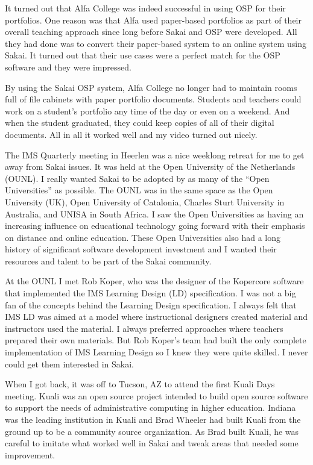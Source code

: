 \documentclass[12pt]{book}
\begin{document}
It turned out that Alfa College was indeed successful
in using OSP for their portfolios.  One reason was that
Alfa used paper-based portfolios as part of their
overall teaching approach since long before Sakai and OSP
were developed.  All they had done was to convert their paper-based
system to an online system using Sakai.  It turned out that their
use cases were a perfect match for the OSP software
and they were impressed.

By using the Sakai OSP system, Alfa College
no longer had to maintain
rooms full of file cabinets with paper portfolio
documents.   Students and teachers could work on a student's
portfolio any time of the day or even on a weekend.  And when
the student graduated, they could keep copies of all of their
digital documents.   All in all it worked well and my
video turned out nicely.

The IMS Quarterly meeting in Heerlen was a nice weeklong
retreat for me to get away from Sakai issues.   It was held at the
Open University of the Netherlands (OUNL).   I really wanted Sakai
to be adopted by as many of the ``Open Universities'' as
possible.  The OUNL was in the same space as the Open University
(UK), Open University of Catalonia, Charles Sturt
University in Australia, and UNISA in South Africa.  I saw the
Open Universities as having an increasing influence on educational
technology going forward with their emphasis on distance and
online education.   These Open Universities also had a long
history of significant software development investment and I
wanted their resources and talent to be part of the Sakai
community.

At the OUNL I met Rob Koper, who was the designer of the
Kopercore software that implemented the IMS Learning Design (LD)
specification.  I was not a big fan of the concepts behind
the Learning Design specification.  I always felt that IMS
LD was aimed at a model where instructional designers created
material and instructors used the material.  I always
preferred approaches where teachers prepared their own
materials.   But Rob Koper's team had built the only
complete implementation of IMS Learning Design so
I knew they were quite skilled.  I never could get
them interested in Sakai.


When I got back, it was off to Tucson, AZ to attend the first
Kuali Days meeting.   Kuali was an open source project
intended to build open source software to support the
needs of administrative computing in higher education.
Indiana was the leading institution in Kuali and Brad Wheeler
had built Kuali from the ground up to be a
community source organization.  As Brad built Kuali,
he was careful to imitate what worked well
in Sakai and tweak areas that needed some improvement.
\end{document}
